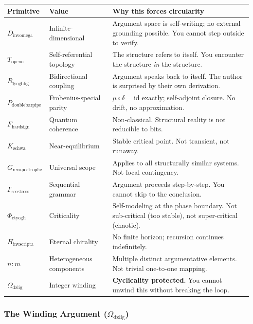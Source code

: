 \documentclass[12pt,a4paper]{article}
\begin{document}
\begin{table}[htbp]
\centering
\small
{}
\begin{tabularx}{\textwidth}{>{\centering\arraybackslash}X >{\centering\arraybackslash}X >{\centering\arraybackslash}X}
\toprule
\rowcolor{gray!25}\textbf{Primitive} & \textbf{Value} & \textbf{Why this forces circularity} \\
\midrule
\rowcolors{1}{white}{gray!10}
$D_{\text{invomega}}$ & Infinite-dimensional & Argument space is self-writing; no external grounding possible. You cannot step outside to verify. \\
$T_{\text{openo}}$ & Self-referential topology & The structure refers to itself. You encounter the structure \emph{in} the structure. \\
$R_{\text{lyoghlig}}$ & Bidirectional coupling & Argument speaks back to itself. The author is surprised by their own derivation. \\
$P_{\text{doublebarpipe}}$ & Frobenius-special parity & $\mu \circ \delta = \text{id}$ exactly; self-adjoint closure. No drift, no approximation. \\
$F_{\text{hardsign}}$ & Quantum coherence & Non-classical. Structural reality is not reducible to bits. \\
$K_{\text{schwa}}$ & Near-equilibrium & Stable critical point. Not transient, not runaway. \\
$G_{\text{revapostrophe}}$ & Universal scope & Applies to all structurally similar systems. Not local contingency. \\
$\Gamma_{\text{secstress}}$ & Sequential grammar & Argument proceeds step-by-step. You cannot skip to the conclusion. \\
$\Phi_{\text{ctyogh}}$ & Criticality & Self-modeling at the phase boundary. Not sub-critical (too stable), not super-critical (chaotic). \\
$H_{\text{invscripta}}$ & Eternal chirality & No finite horizon; recursion continues indefinitely. \\
$n{:}m$ & Heterogeneous components & Multiple distinct argumentative elements. Not trivial one-to-one mapping. \\
$\Omega_{\text{dzlig}}$ & Integer winding & \textbf{Cyclicality protected}. You cannot unwind this without breaking the loop. \\
\bottomrule
\end{tabularx}
\end{table}

\subsubsection{The Winding Argument ($\Omega_{\text{dzlig}}$)}
\end{document}
